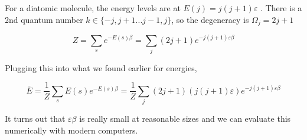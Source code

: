 \documentclass[10pt]{article}
\begin{document}
For a diatomic molecule, the energy levels are at $ E(j) = j(j+1)\varepsilon $ . There is a 2nd quantum number $ k \in \{ -j, j+1 ... j-1, j\} $, so the degeneracy is $ \Omega_j = 2j+1 $ 

\begin{equation}
	Z = \sum_s e^{-E(s)\beta} = \sum_j (2j+1) e^{-j(j+1)\varepsilon\beta}
\end{equation}

Plugging this into what we found earlier for energies,

\begin{equation}
	\overline{E} = \frac{1}{Z} \sum_s E(s) e^{-E(s)\beta} = \frac{1}{Z} \sum_j (2j+1)(j(j+1)\varepsilon)e^{-j(j+1)\varepsilon\beta}
\end{equation}

It turns out that $ \varepsilon\beta $  is really small at reasonable sizes and we can evaluate this numerically with modern computers.
\end{document}
